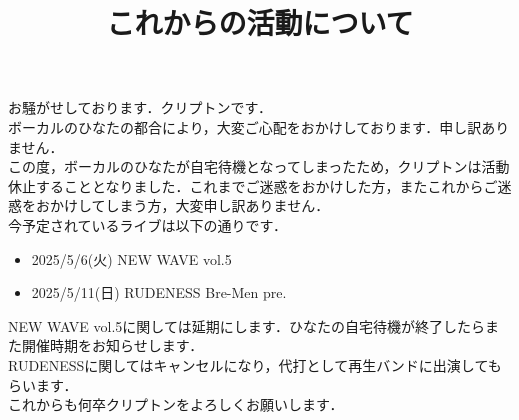 \documentclass[a4paper,14pt,dvipdfmx]{jsarticle}
\begin{document}
\title{これからの活動について}
\date{}
\maketitle

お騒がせしております．クリプトンです．\\

ボーカルのひなたの都合により，大変ご心配をおかけしております．申し訳ありません．\\

この度，ボーカルのひなたが自宅待機となってしまったため，クリプトンは活動休止することとなりました．これまでご迷惑をおかけした方，またこれからご迷惑をおかけしてしまう方，大変申し訳ありません． \\

今予定されているライブは以下の通りです．
\begin{itemize}
  \item 2025/5/6(火) NEW WAVE vol.5
  \item 2025/5/11(日) RUDENESS Bre-Men pre.
\end{itemize}

 NEW WAVE vol.5に関しては延期にします．ひなたの自宅待機が終了したらまた開催時期をお知らせします．\\
 RUDENESSに関してはキャンセルになり，代打として再生バンドに出演してもらいます． \\

これからも何卒クリプトンをよろしくお願いします．\\
\end{document}
